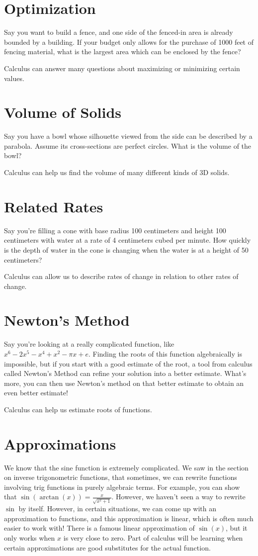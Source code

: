\documentclass{ximera}
\begin{document}
\section{Optimization}
Say you want to build a fence, and one side of the fenced-in area is already bounded by a building. If your budget only allows for the purchase of 1000 feet of fencing material, what is the largest area which can be enclosed by the fence?

Calculus can answer many questions about maximizing or minimizing certain values. 

\section{Volume of Solids}
Say you have a bowl whose silhouette viewed from the side can be described by a parabola. Assume its cross-sections are perfect circles. What is the volume of the bowl? 

Calculus can help us find the volume of many different kinds of 3D solids. 

\section{Related Rates}
Say you're filling a cone with base radius 100 centimeters and height 100 centimeters with water at a rate of 4 centimeters cubed per minute. How quickly is the depth of water in the cone is changing when the water is at a height of 50 centimeters? 

Calculus can allow us to describe rates of change in relation to other rates of change. 

\section{Newton's Method}
Say you're looking at a really complicated function, like $x^6 - 2x^5 - x^4 + x^2 - \pi x + e$. Finding the roots of this function algebraically is impossible, but if you start with a good estimate of the root, a tool from calculus called Newton's Method can refine your solution into a better estimate. What's more, you can then use Newton's method on that better estimate to obtain an even better estimate!

Calculus can help us estimate roots of functions. 

\section{Approximations}
We know that the sine function is extremely complicated. We saw in the section on inverse trigonometric functions, that sometimes, we can rewrite functions involving trig functions in purely algebraic terms. For example, you can show that $\sin(\arctan(x)) = \frac{x}{\sqrt{x^2 + 1}}$. However, we haven't seen a way to rewrite $\sin$ by itself. However, in certain situations, we can come up with an approximation to functions, and this approximation is linear, which is often much easier to work with! There is a famous linear approximation of $\sin(x)$, but it only works when $x$ is very close to zero. Part of calculus will be learning when certain approximations are good substitutes for the actual function.
\end{document}
